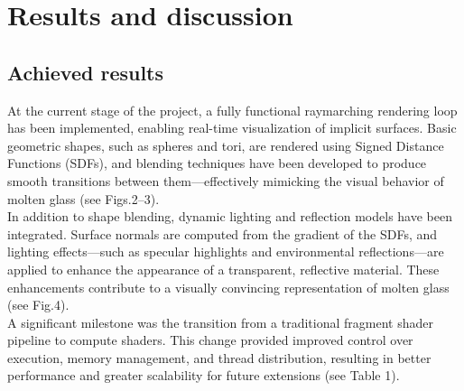 \documentclass{rapportcs}
\begin{document}
    \newpage

\section{Results and discussion}

    \subsection{Achieved results}
    
        At the current stage of the project, a fully functional raymarching rendering loop has been implemented, enabling real-time visualization of implicit surfaces. Basic geometric shapes, such as spheres and tori, are rendered using Signed Distance Functions (SDFs), and blending techniques have been developed to produce smooth transitions between them—effectively mimicking the visual behavior of molten glass (see Figs.2–3).\\

        In addition to shape blending, dynamic lighting and reflection models have been integrated. Surface normals are computed from the gradient of the SDFs, and lighting effects—such as specular highlights and environmental reflections—are applied to enhance the appearance of a transparent, reflective material. These enhancements contribute to a visually convincing representation of molten glass (see Fig.4).\\
        
        A significant milestone was the transition from a traditional fragment shader pipeline to compute shaders. This change provided improved control over execution, memory management, and thread distribution, resulting in better performance and greater scalability for future extensions (see Table 1).

        \begin{table}[h]
            \centering
            \caption{Comparison between fragment shader and compute shader}
        \end{table}
\end{document}
